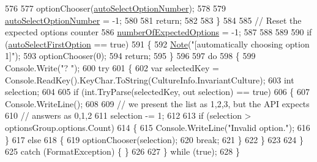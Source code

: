 \begin{DoxyCode}
576 
577                     optionChooser(\hyperlink{a00055_a34886671e91a1bf3fc225eeb67baced1}{autoSelectOptionNumber});
578 
579                     \hyperlink{a00055_a34886671e91a1bf3fc225eeb67baced1}{autoSelectOptionNumber} = -1;
580 
581                     \textcolor{keywordflow}{return};
582 
583                 \}
584 
585                 \textcolor{comment}{// Reset the expected options counter}
586                 \hyperlink{a00055_a2e17937195ecd64d5d867d958c45d2c3}{numberOfExpectedOptions} = -1;
587 
588 
589 
590                 \textcolor{keywordflow}{if} (\hyperlink{a00055_a09a552ee9ff58cb3c995f8ecba1592b6}{autoSelectFirstOption} == \textcolor{keyword}{true})
591                 \{
592                     \hyperlink{a00174_a939cc9e943c574b36c6af93e9c772702}{Note}(\textcolor{stringliteral}{"[automatically choosing option 1]"});
593                     optionChooser(0);
594                     \textcolor{keywordflow}{return};
595                 \}
596 
597                 \textcolor{keywordflow}{do}
598                 \{
599                     Console.Write(\textcolor{stringliteral}{"? "});
600                     \textcolor{keywordflow}{try}
601                     \{
602                         var selectedKey = Console.ReadKey().KeyChar.ToString(CultureInfo.InvariantCulture);
603                         \textcolor{keywordtype}{int} selection;
604 
605                         \textcolor{keywordflow}{if} (\textcolor{keywordtype}{int}.TryParse(selectedKey, out selection) == \textcolor{keyword}{true})
606                         \{
607                             Console.WriteLine();
608 
609                             \textcolor{comment}{// we present the list as 1,2,3, but the API expects}
610                             \textcolor{comment}{// answers as 0,1,2}
611                             selection -= 1;
612 
613                             \textcolor{keywordflow}{if} (selection > optionsGroup.options.Count)
614                             \{
615                                 Console.WriteLine(\textcolor{stringliteral}{"Invalid option."});
616                             \}
617                             \textcolor{keywordflow}{else}
618                             \{
619                                 optionChooser(selection);
620                                 \textcolor{keywordflow}{break};
621                             \}
622                         \}
623 
624                     \}
625                     \textcolor{keywordflow}{catch} (FormatException) \{ \}
626 
627                 \} \textcolor{keywordflow}{while} (\textcolor{keyword}{true});
628             \}
\end{DoxyCode}


